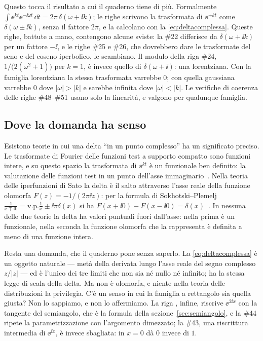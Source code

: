 Questo tocca il risultato a cui il quaderno tiene di pi\`u. Formalmente
$\int\ee^{kt}\ee^{-\ii\omega t}\,\dd t=2\pi\,\delta(\omega+\ii k)$; le righe
 scrivono la trasformata di $\ee^{\pm kt}$ come
$\delta(\omega\pm\ii k)$, senza il fattore $2\pi$, e la calcolano con la
\eqref{eq:deltacomplessa}. Queste righe, battute a mano, contengono alcune
sviste: la \#22 differisce da $\delta(\omega+\ii k)$ per un fattore $-\ii$, e
le righe \#25 e \#26, che dovrebbero dare le trasformate del seno e del coseno
iperbolico, le scambiano. Il modulo della riga \#24,
$1/\bigl(2(\omega^2+1)\bigr)$ per $k=1$, \`e invece quello di
$\delta(\omega+\ii)$: una lorentziana. Con la famiglia lorentziana la stessa
trasformata varrebbe $0$; con quella gaussiana varrebbe $0$ dove
$|\omega|>|k|$ e sarebbe infinita dove $|\omega|<|k|$. Le verifiche di coerenza delle righe \#48--\#51 usano solo
la linearit\`a, e valgono per qualunque famiglia.

\subsection{Dove la domanda ha senso}

Esistono teorie in cui una delta ``in un punto complesso'' ha un significato
preciso. Le trasformate di Fourier delle funzioni test a supporto compatto
sono funzioni intere, e su questo spazio la trasformata di $\ee^{kt}$ \`e un
funzionale ben definito: la valutazione delle funzioni test in un punto
dell'asse immaginario~\cite{gelfand1964}. Nella teoria delle iperfunzioni di
Sato la delta \`e il salto attraverso l'asse reale della funzione olomorfa
$F(z)=-1/(2\pi\ii z)$: per la formula di Sokhotski--Plemelj
$\frac{1}{x\mp\ii0}=\mathrm{v.p.}\frac1x\pm\ii\pi\delta(x)$ si ha
$F(x+\ii0)-F(x-\ii0)=\delta(x)$~\cite{kaneko1988}. In nessuna delle due
teorie la delta ha valori puntuali fuori dall'asse: nella prima \`e un
funzionale, nella seconda la funzione olomorfa che la rappresenta \`e
definita a meno di una funzione intera.

Resta una domanda, che il quaderno pone senza saperlo. La
\eqref{eq:deltacomplessa} \`e un oggetto naturale --- met\`a della derivata
lungo l'asse reale del segno complesso $z/|z|$ --- ed \`e l'unico dei tre
limiti che non sia n\'e nullo n\'e infinito; ha la stessa legge di scala
della delta. Ma non \`e olomorfa, e niente nella teoria delle distribuzioni
la privilegia. C'\`e un senso in cui la famiglia a rettangolo sia quella
giusta? Non lo sappiamo, e non lo affermiamo. La riga
, infine, riscrive $\ee^{2\ii x}$ con la tangente del
semiangolo, che \`e la formula della sezione~\ref{sec:semiangolo}, e la \#44
ripete la parametrizzazione con l'argomento dimezzato; la \#43, una
riscrittura intermedia di $\ee^{\ii x}$, \`e invece sbagliata: in $x=0$ d\`a
$0$ invece di $1$.

